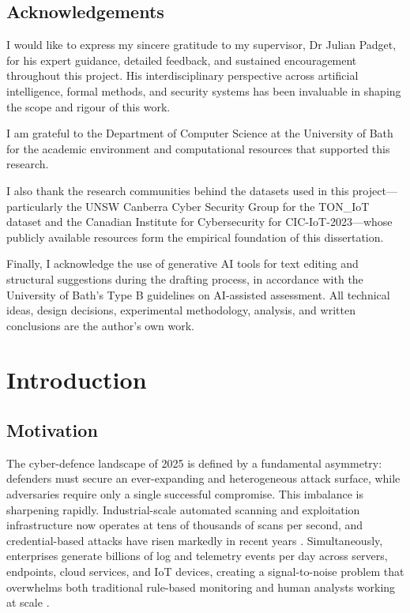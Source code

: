 \documentclass[12pt,a4paper]{report}
\begin{document}
\newpage
\section*{Acknowledgements}
I would like to express my sincere gratitude to my supervisor, Dr Julian Padget, for his expert guidance, detailed feedback, and sustained encouragement throughout this project. His interdisciplinary perspective across artificial intelligence, formal methods, and security systems has been invaluable in shaping the scope and rigour of this work.

I am grateful to the Department of Computer Science at the University of Bath for the academic environment and computational resources that supported this research.

I also thank the research communities behind the datasets used in this project---particularly the UNSW Canberra Cyber Security Group for the TON\_IoT dataset and the Canadian Institute for Cybersecurity for CIC-IoT-2023---whose publicly available resources form the empirical foundation of this dissertation.

Finally, I acknowledge the use of generative AI tools for text editing and structural suggestions during the drafting process, in accordance with the University of Bath's Type B guidelines on AI-assisted assessment. All technical ideas, design decisions, experimental methodology, analysis, and written conclusions are the author's own work.

\tableofcontents
\listoftables

\chapter{Introduction}
\label{ch:introduction}

\section{Motivation}
\label{sec:motivation}

The cyber-defence landscape of 2025 is defined by a fundamental asymmetry: defenders must secure an ever-expanding and heterogeneous attack surface, while adversaries require only a single successful compromise. This imbalance is sharpening rapidly. Industrial-scale automated scanning and exploitation infrastructure now operates at tens of thousands of scans per second, and credential-based attacks have risen markedly in recent years \citep{fortinet2025}. Simultaneously, enterprises generate billions of log and telemetry events per day across servers, endpoints, cloud services, and IoT devices, creating a signal-to-noise problem that overwhelms both traditional rule-based monitoring and human analysts working at scale \citep{dang2023}.
\end{document}
